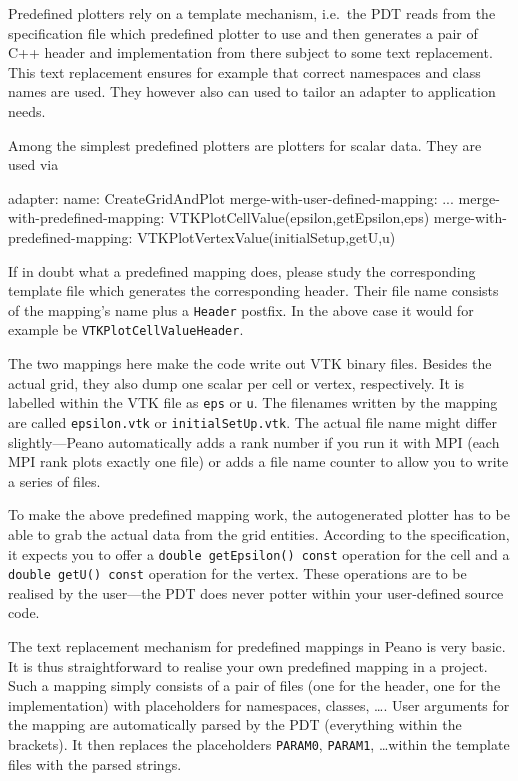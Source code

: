 Predefined plotters rely on a template mechanism, i.e.~the PDT reads from the
specification file which predefined plotter to use and then generates a pair of
C++ header and implementation from there subject to some text replacement.
This text replacement ensures for example that correct namespaces and class
names are used.
They however also can used to tailor an adapter to application needs.

Among the simplest predefined plotters are plotters for scalar data.
They are used via 
\begin{code}
adapter:
  name: CreateGridAndPlot
  merge-with-user-defined-mapping: ...
  merge-with-predefined-mapping: VTKPlotCellValue(epsilon,getEpsilon,eps)
  merge-with-predefined-mapping: VTKPlotVertexValue(initialSetup,getU,u)
\end{code}

\noindent
If in doubt what a predefined mapping does, please study the corresponding
template file which generates the corresponding header. 
Their file name consists of the mapping's name plus a \texttt{Header} postfix.
In the above case it would for example be \texttt{VTKPlotCellValueHeader}.


The two mappings here make the code write out VTK binary files.
Besides the actual grid, they also dump one scalar per cell or vertex,
respectively.
It is labelled within the VTK file as \texttt{eps} or \texttt{u}.
The filenames written by the mapping are called \texttt{epsilon.vtk} or
\texttt{initialSetUp.vtk}.
The actual file name might differ slightly---Peano automatically adds a rank
number if you run it with MPI (each MPI rank plots exactly one file) or adds a
file name counter to allow you to write a series of files.

To make the above predefined mapping work, the autogenerated plotter has to be
able to grab the actual data from the grid entities.
According to the specification, it expects you to offer a \texttt{double
getEpsilon() const} operation for the cell and a \texttt{double getU() const}
operation for the vertex.
These operations are to be realised by the user---the PDT does never potter
within your user-defined source code.

\begin{remark}
 The text replacement mechanism for predefined mappings in Peano is very basic.
 It is thus straightforward to realise your own predefined mapping in a project.
 Such a mapping simply consists of a pair of files (one for the header, one for
 the implementation) with placeholders for namespaces, classes, \ldots. User
 arguments for the mapping are automatically parsed by the PDT
 (everything within the brackets). It then replaces the placeholders
 \texttt{PARAM0}, \texttt{PARAM1}, \ldots within the template files with the
 parsed strings.
\end{remark}


